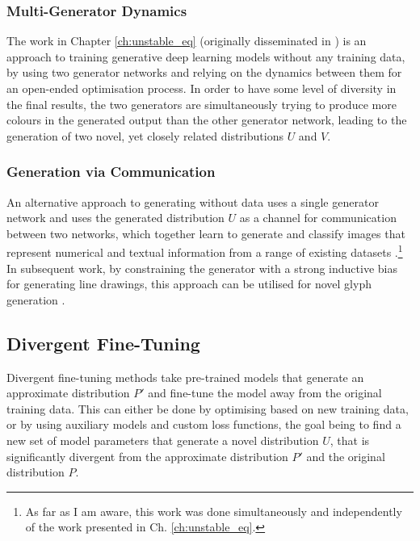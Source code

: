 \subsubsection{Multi-Generator Dynamics}

The work in Chapter \ref{ch:unstable_eq} (originally disseminated in \citep{broad2019searching}) is an approach to training generative deep learning models without any training data, by using two generator networks and relying on the dynamics between them for an open-ended optimisation process. 
In order to have some level of diversity in the final results, the two generators are simultaneously trying to produce more colours in the generated output than the other generator network, leading to the generation of two novel, yet closely related distributions $U$ and $V$.

\subsubsection{Generation via Communication} 

An alternative approach to generating without data uses a single generator network and uses the generated distribution $U$ as a channel for communication between two networks, which together learn to generate and classify images that represent numerical and textual information from a range of existing datasets \citep{simon2019dimensions}.\footnote{As far as I am aware, this work was done simultaneously and independently of the work presented in Ch. \ref{ch:unstable_eq}.} 
In subsequent work, by constraining the generator with a strong inductive bias for generating line drawings, this approach can be utilised for novel glyph generation \citep{park2020generating}.


\subsection{Divergent Fine-Tuning}
\label{survey:divergent}

Divergent fine-tuning methods take pre-trained models that generate an approximate distribution $P'$ and fine-tune the model away from the original training data. 
This can either be done by optimising based on new training data, or by using auxiliary models and custom loss functions, the goal being to find a new set of model parameters that generate a novel distribution $U$, that is significantly divergent from the approximate distribution $P'$ and the original distribution $P$.

